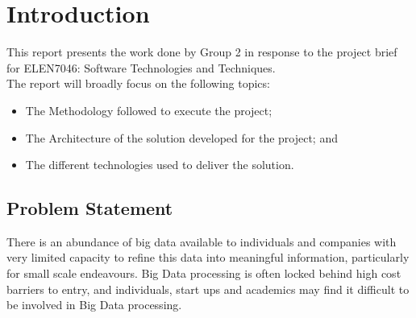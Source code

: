 \documentclass[12pt]{article} %
\begin{document}
		
	
		\newpage
	
	
	\tableofcontents %
	
	\newpage %
	

	
	\section{Introduction} %
	
This report presents the work done by Group 2 in response to the project brief for ELEN7046: Software Technologies and Techniques.\\

The report will broadly focus on the following topics:

\begin{itemize}
	\item The Methodology followed to execute the project;
	\item The Architecture of the solution developed for the project; and
	\item The different technologies used to deliver the solution.
\end{itemize}

\subsection{Problem Statement}

There is an abundance of big data available to individuals and companies with very limited capacity to refine this data into meaningful information, particularly for small scale endeavours. Big Data processing is often locked behind high cost barriers to entry, and individuals, start ups and academics may find it difficult to be involved in Big Data processing.
\end{document}
